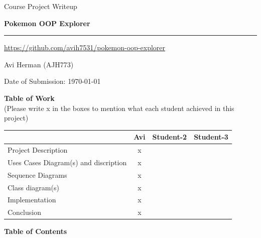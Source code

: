 \documentclass[12pt]{article}
\begin{document}
\begin{titlepage}
\centering

\vspace*{1cm}
{\large Course Project Writeup}

\vspace{4cm}

{\Huge \textbf{Pokemon OOP Explorer}}

\vspace{0.5cm}
\rule{0.8\textwidth}{0.5pt}

\vspace{0.5cm}
{\large \url{https://github.com/avih7531/pokemon-oop-explorer}}

\vspace{3cm}

\vspace{0.5cm}
Avi Herman (AJH773)

\vfill

\begin{flushleft}
Date of Submission: \today
\end{flushleft}

\end{titlepage}

\newpage
\begin{center}
{\LARGE \textbf{Table of Work}} \\[0.5em]
{\small (Please write x in the boxes to mention what each student achieved in this project)}
\end{center}

\vspace{1cm}

\renewcommand{\arraystretch}{1.8}
\begin{tabular}{|p{6cm}|c|c|c|}
\hline
 & Avi & Student-2 & Student-3 \\
\hline
Project Description & x &  &  \\
\hline
Uses Cases Diagram(s) and discription & x &  &  \\
\hline
Sequence Diagrams & x &  &  \\
\hline
Class diagram(s) & x &  &  \\
\hline
Implementation & x &  &  \\
\hline
Conclusion & x &  &  \\
\hline
\end{tabular}

\newpage
\begin{center}
{\LARGE \textbf{Table of Contents}}
\end{center}
\end{document}
